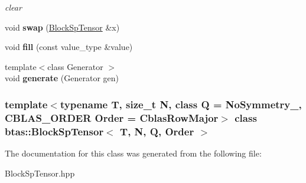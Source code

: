 \begin{DoxyCompactItemize}
\begin{DoxyCompactList}\small\item\em clear \item\end{DoxyCompactList}\item 
\hypertarget{classbtas_1_1_block_sp_tensor_a1ca749717220921ae6c5989784a14052}{
void {\bfseries swap} (\hyperlink{classbtas_1_1_block_sp_tensor}{BlockSpTensor} \&x)}
\label{classbtas_1_1_block_sp_tensor_a1ca749717220921ae6c5989784a14052}

\item 
\hypertarget{classbtas_1_1_block_sp_tensor_a36300f0c341076ff1071f9911e41869e}{
void {\bfseries fill} (const value\_\-type \&value)}
\label{classbtas_1_1_block_sp_tensor_a36300f0c341076ff1071f9911e41869e}

\item 
\hypertarget{classbtas_1_1_block_sp_tensor_ab353a930ddf281fad9f4f850c0f40dbb}{
{\footnotesize template$<$class Generator $>$ }\\void {\bfseries generate} (Generator gen)}
\label{classbtas_1_1_block_sp_tensor_ab353a930ddf281fad9f4f850c0f40dbb}

\end{DoxyCompactItemize}
\subsubsection*{template$<$typename T, size\_\-t N, class Q = NoSymmetry\_\-, CBLAS\_\-ORDER Order = CblasRowMajor$>$ class btas::BlockSpTensor$<$ T, N, Q, Order $>$}



The documentation for this class was generated from the following file:\begin{DoxyCompactItemize}
\item 
BlockSpTensor.hpp\end{DoxyCompactItemize}
